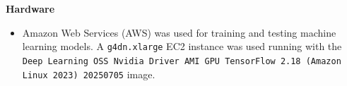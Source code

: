 \documentclass[ %
                    author={Raj Dhakan},
                supervisor={Dr. Ayush Joshi},
                    degree={MSc},
                     title={Ethereum Price Prediction using Internal and External Factors},
                  subtitle={},
                      type={},
                      year={2025}]{dissertation}
\begin{document}

 

\textbf{Hardware}
\begin{itemize}
    \item Amazon Web Services (AWS) was used for training and testing machine learning models. A \texttt{g4dn.xlarge} EC2 instance was used running with the \texttt{Deep Learning OSS Nvidia Driver AMI GPU TensorFlow 2.18 (Amazon Linux 2023) 20250705} image.
\end{itemize}
\end{document}
